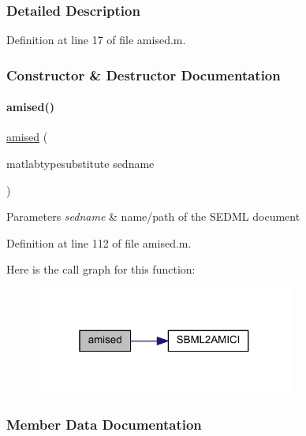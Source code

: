 \subsubsection{Detailed Description}


Definition at line 17 of file amised.\+m.



\subsubsection{Constructor \& Destructor Documentation}
\mbox{\label{classamised_ad3f005f06f3a83fccf6ae55ad0d102c0}} 
\paragraph{\texorpdfstring{amised()}{amised()}}
{\footnotesize\ttfamily \mbox{\hyperlink{classamised}{amised}} (\begin{DoxyParamCaption}\item[{matlabtypesubstitute}]{sedname }\end{DoxyParamCaption})}


\begin{DoxyParams}{Parameters}
{\em sedname} & name/path of the S\+E\+D\+ML document \\
\hline
\end{DoxyParams}


Definition at line 112 of file amised.\+m.

Here is the call graph for this function\+:
\nopagebreak
\begin{figure}[H]
\begin{center}
\leavevmode
\includegraphics[width=241pt]{classamised_ad3f005f06f3a83fccf6ae55ad0d102c0_cgraph}
\end{center}
\end{figure}


\subsubsection{Member Data Documentation}
\mbox{\label{classamised_a508cc3106d2c29fe07dc87cbe3ea6927}} 
